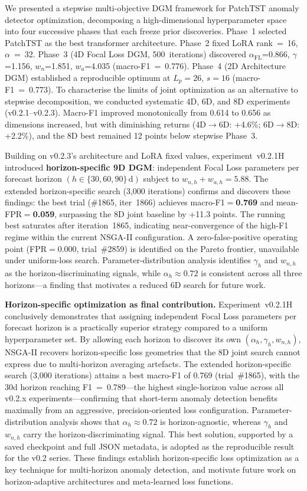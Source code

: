 ﻿\documentclass[twocolumn]{article}
\begin{document}
We presented a stepwise multi-objective DGM framework for PatchTST
anomaly detector optimization, decomposing a high-dimensional
hyperparameter space into four successive phases that each freeze
prior discoveries.
Phase~1 selected PatchTST as the best transformer architecture.
Phase~2 fixed LoRA rank~=~16, $\alpha$~=~32.
Phase~3 (4D Focal Loss DGM, 500~iterations) discovered
$\alpha_\text{FL}$=0.866, $\gamma$=1.156,
$w_n$=1.851, $w_a$=4.035 (macro-F1~=~0.776).
Phase~4 (2D Architecture DGM) established a reproducible optimum
at $L_p{=}26$, $s{=}16$ (macro-F1~=~0.773).
To characterise the limits of joint optimization as an alternative
to stepwise decomposition, we conducted systematic 4D, 6D, and 8D
experiments (v0.2.1--v0.2.3).
Macro-F1 improved monotonically from 0.614 to 0.656 as dimensions
increased, but with diminishing returns
(4D$\to$6D: +4.6\%; 6D$\to$8D: +2.2\%),
and the 8D best remained 12 points below stepwise Phase~3.

Building on v0.2.3's architecture and LoRA fixed values,
experiment~v0.2.1H introduced \textbf{horizon-specific 9D DGM}:
independent Focal Loss parameters per forecast horizon
$(h\in\{30,60,90\}\,\mathrm{d})$ subject to
$w_{n,h}+w_{a,h}=5.88$.
The extended horizon-specific search (3{,}000 iterations) confirms and discovers
these findings: the best trial (\#1865, iter~1866) achieves
macro-F1$=$\textbf{0.769} and mean-FPR$=$\textbf{0.059},
surpassing the 8D joint baseline by +11.3 points.
The running best saturates after iteration~1865, indicating near-convergence
of the high-F1 regime within the current NSGA-II configuration.
A zero-false-positive operating point (FPR$=$0.000, trial~\#2859)
is identified on the Pareto frontier, unavailable under uniform-loss search.
Parameter-distribution analysis identifies $\gamma_h$ and $w_{n,h}$ as the
horizon-discriminating signals, while $\alpha_h \approx 0.72$ is consistent
across all three horizons---a finding that motivates a reduced 6D search
for future work.

\textbf{Horizon-specific optimization as final contribution.}
Experiment~v0.2.1H conclusively demonstrates that assigning
independent Focal Loss parameters per forecast horizon is a
practically superior strategy compared to a uniform
hyperparameter set.
By allowing each horizon to discover its own $(\alpha_h, \gamma_h, w_{n,h})$,
NSGA-II recovers horizon-specific loss geometries that the 8D joint
search cannot express due to multi-horizon averaging artefacts.
The extended horizon-specific search (3{,}000 iterations) attains a best
macro-F1 of 0.769 (trial~\#1865), with the 30d horizon reaching
F1~=~0.789---the highest single-horizon value across all v0.2.x
experiments---confirming that short-term anomaly detection
benefits maximally from an aggressive, precision-oriented
loss configuration.
Parameter-distribution analysis shows that $\alpha_h \approx 0.72$
is horizon-agnostic, whereas $\gamma_h$ and $w_{n,h}$ carry the
horizon-discriminating signal.
This best solution, supported by a saved checkpoint and full JSON
metadata, is adopted as the reproducible result for the v0.2 series.
These findings establish horizon-specific loss optimization as a
key technique for multi-horizon anomaly detection, and motivate
future work on horizon-adaptive architectures and meta-learned
loss functions.
\end{document}
